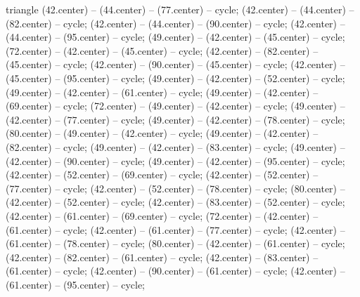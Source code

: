 \begin{pgfonlayer}{triangle}
 (42.center) -- (44.center) -- (77.center) -- cycle; 
 (42.center) -- (44.center) -- (82.center) -- cycle; 
 (42.center) -- (44.center) -- (90.center) -- cycle; 
 (42.center) -- (44.center) -- (95.center) -- cycle; 
 (49.center) -- (42.center) -- (45.center) -- cycle; 
 (72.center) -- (42.center) -- (45.center) -- cycle; 
 (42.center) -- (82.center) -- (45.center) -- cycle; 
 (42.center) -- (90.center) -- (45.center) -- cycle; 
 (42.center) -- (45.center) -- (95.center) -- cycle; 
 (49.center) -- (42.center) -- (52.center) -- cycle; 
 (49.center) -- (42.center) -- (61.center) -- cycle; 
 (49.center) -- (42.center) -- (69.center) -- cycle; 
 (72.center) -- (49.center) -- (42.center) -- cycle; 
 (49.center) -- (42.center) -- (77.center) -- cycle; 
 (49.center) -- (42.center) -- (78.center) -- cycle; 
 (80.center) -- (49.center) -- (42.center) -- cycle; 
 (49.center) -- (42.center) -- (82.center) -- cycle; 
 (49.center) -- (42.center) -- (83.center) -- cycle; 
 (49.center) -- (42.center) -- (90.center) -- cycle; 
 (49.center) -- (42.center) -- (95.center) -- cycle; 
 (42.center) -- (52.center) -- (69.center) -- cycle; 
 (42.center) -- (52.center) -- (77.center) -- cycle; 
 (42.center) -- (52.center) -- (78.center) -- cycle; 
 (80.center) -- (42.center) -- (52.center) -- cycle; 
 (42.center) -- (83.center) -- (52.center) -- cycle; 
 (42.center) -- (61.center) -- (69.center) -- cycle; 
 (72.center) -- (42.center) -- (61.center) -- cycle; 
 (42.center) -- (61.center) -- (77.center) -- cycle; 
 (42.center) -- (61.center) -- (78.center) -- cycle; 
 (80.center) -- (42.center) -- (61.center) -- cycle; 
 (42.center) -- (82.center) -- (61.center) -- cycle; 
 (42.center) -- (83.center) -- (61.center) -- cycle; 
 (42.center) -- (90.center) -- (61.center) -- cycle; 
 (42.center) -- (61.center) -- (95.center) -- cycle; 

\end{pgfonlayer}
